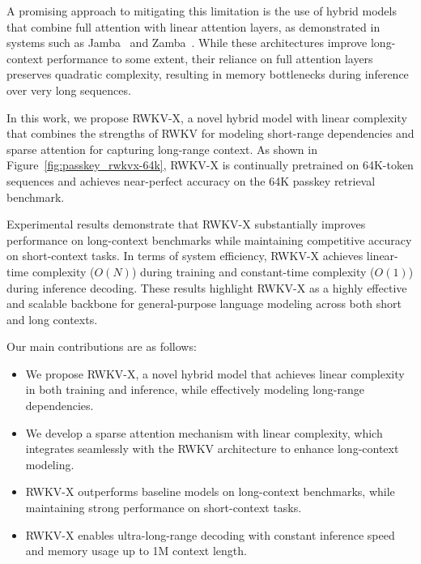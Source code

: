 A promising approach to mitigating this limitation is the use of hybrid models that combine full attention with linear attention layers, as demonstrated in systems such as Jamba~\cite{Lieber2024JambaAH} and Zamba~\cite{glorioso2024zambacompact7bssm}. 
While these architectures improve long-context performance to some extent, their reliance on full attention layers preserves quadratic complexity, resulting in memory bottlenecks during inference over very long sequences.

In this work, we propose RWKV-X, a novel hybrid model with linear complexity that combines the strengths of RWKV for modeling short-range dependencies and sparse attention for capturing long-range context.
As shown in Figure~\ref{fig:passkey_rwkvx-64k}, RWKV-X is continually pretrained on 64K-token sequences and achieves near-perfect accuracy on the 64K passkey retrieval benchmark.

Experimental results demonstrate that RWKV-X substantially improves performance on long-context benchmarks while maintaining competitive accuracy on short-context tasks. In terms of system efficiency, RWKV-X achieves linear-time complexity ($O(N)$) during training and constant-time complexity ($O(1)$) during inference decoding. These results highlight RWKV-X as a highly effective and scalable backbone for general-purpose language modeling across both short and long contexts.

Our main contributions are as follows:
\begin{itemize}
    \item We propose RWKV-X, a novel hybrid model that achieves linear complexity in both training and inference, while effectively modeling long-range dependencies.
    \item We develop a sparse attention mechanism with linear complexity, which integrates seamlessly with the RWKV architecture to enhance long-context modeling.
    \item RWKV-X outperforms baseline models on long-context benchmarks, while maintaining strong performance on short-context tasks.
    \item RWKV-X enables ultra-long-range decoding with constant inference speed and memory usage up to 1M context length.
\end{itemize}

